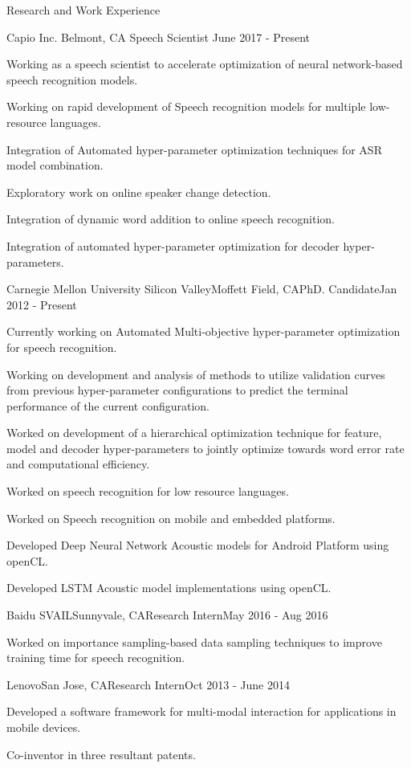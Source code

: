\documentclass{resume} %
\begin{document}
\begin{rSection}{Research and Work Experience}

\begin{rSubsection} {Capio Inc.} {Belmont, CA} {Speech Scientist} {June 2017 - Present}
\item Working as a speech scientist to accelerate optimization of neural network-based speech recognition models.
\item Working on rapid development of Speech recognition models for multiple low-resource languages.
\item Integration of Automated hyper-parameter optimization techniques for ASR model combination.
\item Exploratory work on online speaker change detection.
\item Integration of dynamic word addition to online speech recognition.
\item Integration of automated hyper-parameter optimization for decoder hyper-parameters.
\end{rSubsection}
\begin{rSubsection}{Carnegie Mellon University Silicon Valley}{Moffett Field, CA}{PhD. Candidate}{Jan 2012 - Present}
\item Currently working on Automated Multi-objective hyper-parameter optimization for speech recognition.
\item Working on development and analysis of methods to utilize validation curves from previous hyper-parameter configurations to predict the terminal performance of the current configuration.
\item Worked on development of a hierarchical optimization technique for feature, model and decoder hyper-parameters to jointly optimize towards word error rate and computational efficiency.
\item Worked on speech recognition for low resource languages.
\item Worked on Speech recognition on mobile and embedded platforms.
\item Developed Deep Neural Network Acoustic models for Android Platform using openCL.
\item Developed LSTM Acoustic model implementations using openCL.
\end{rSubsection}


\begin{rSubsection}{Baidu SVAIL}{Sunnyvale, CA}{Research Intern}{May 2016 - Aug 2016}
\item Worked on importance sampling-based data sampling techniques to improve training time for speech recognition.
\end{rSubsection}
\newpage
\begin{rSubsection}{Lenovo}{San Jose, CA}{Research Intern}{Oct 2013 - June 2014}
\item Developed a software framework for multi-modal interaction for applications in mobile devices.
\item Co-inventor in three resultant patents. 
\end{rSubsection}


\end{rSection}
\end{document}
